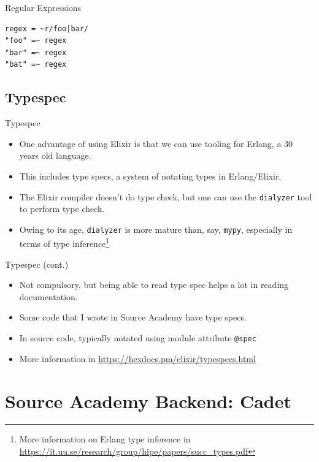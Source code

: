 \documentclass[12pt]{beamer}
\begin{document}
\begin{frame}[fragile]{Regular Expressions}
  \begin{verbatim}
regex = ~r/foo|bar/
"foo" =~ regex
"bar" =~ regex
"bat" =~ regex
  \end{verbatim}
\end{frame}

\subsection{Typespec}
\begin{frame}{Typespec}
  \begin{itemize}
    \item One advantage of using Elixir is that we can use tooling for Erlang, a 30 years old language.
    \item This includes type specs, a system of notating types in Erlang/Elixir.
    \item The Elixir compiler doesn't do type check, but one can use the \texttt{dialyzer} tool to perform type check.
    \item Owing to its age, \texttt{dialyzer} is more mature than, say, \texttt{mypy}, especially in terms of type inference\footnote{More information on Erlang type inference in \url{https://it.uu.se/research/group/hipe/papers/succ_types.pdf}}
  \end{itemize}
\end{frame}

\begin{frame}{Typespec (cont.)}
  \begin{itemize}
    \item Not compulsory, but being able to read type spec helps a lot in reading documentation.
    \item Some code that I wrote in Source Academy have type specs.
    \item In source code, typically notated using module attribute \texttt{@spec}
    \item More information in \url{https://hexdocs.pm/elixir/typespecs.html}
  \end{itemize}
\end{frame}

\section{Source Academy Backend: Cadet}
\end{document}
